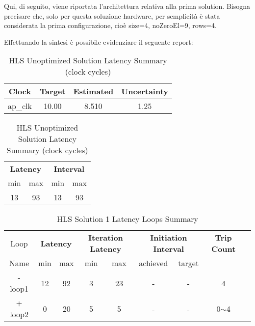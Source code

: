Qui, di seguito, viene riportata l'architettura relativa alla prima solution. Bisogna precisare che, solo per questa soluzione hardware, per semplicità è stata considerata la prima configurazione, cioè size=4, noZeroEl=9, rows=4.



Effettuando la sintesi è possibile evidenziare il seguente report:\\
\begin{table}[H]
	\centering
	\begin{minipage}[t]{0.45\linewidth}
		\centering
		\begin{tabular}{|c|c|c|c|}
			\hline
			\textbf{Clock} & \textbf{Target} & \textbf{Estimated} & \textbf{Uncertainty} \\
			\hline
			ap\_clk & 10.00 & 8.510 & 1.25 \\
			\hline
		\end{tabular}
		\caption{HLS Solution 1 Timing Summary (ns)}
		\label{tab:hls-solution-1-timing-summary}
	\end{minipage}
	\hfill
	\begin{minipage}[t]{0.45\linewidth}
		\centering
		\begin{tabular}{|c|c|c|c|}
			\hline
			\multicolumn{2}{|c|}{\textbf{Latency}} & \multicolumn{2}{|c|}{\textbf{Interval}} \\
			min & max & min & max \\
			\hline
			13 & 93 & 13 & 93 \\
			\hline
		\end{tabular}
		\caption{HLS Unoptimized Solution Latency Summary (clock cycles)}
		\label{tab:hls-unoptimized-solution-latency-summary}
	\end{minipage}
\end{table}

\begin{table}[H]
	\centering
	\begin{tabular}{|c|c|c|c|c|c|c|c|c|}
		\hline
		\multicolumn{1}{|c|}{Loop} & \multicolumn{2}{|c|}{\textbf{Latency}} & \multicolumn{2}{c|}{\textbf{Iteration Latency}} & \multicolumn{2}{c|}{\textbf{Initiation Interval}} & \multicolumn{1}{c|}{\textbf{Trip Count}}  \\
		Name & min & max & min & max & achieved & target &  \\
		\hline
		- loop1 & 12 & 92 & 3 & 23 & - & - & 4 \\
		+ loop2 & 0 & 20 & 5 & 5 & - & - & 0$\sim$4 \\
		\hline
	\end{tabular}
	\caption{HLS Solution 1 Latency Loops Summary }
	\label{tab:hls-solution-1-loop-summary}
\end{table}

